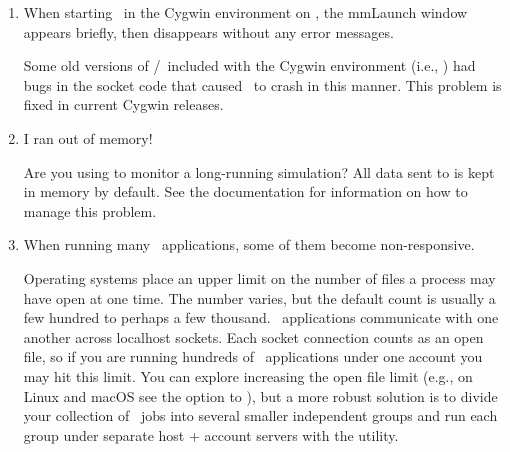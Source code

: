 \begin{enumerate}

\item When starting \OOMMF\ in the Cygwin environment on \Windows, the
mmLaunch window appears briefly, then disappears without any error
messages.

Some old versions of \Tcl/\Tk\ included with the Cygwin environment
(i.e., ) had bugs in the socket code
that caused \OOMMF\ to crash in this manner.  This problem is fixed in
current Cygwin releases.

\item I ran out of memory!

Are you using  to monitor a
long-running simulation?  All data sent to  is kept in
memory by default.  See the  documentation for information
on how to manage this problem.

\item When running many \OOMMF\ applications, some of them become
  non-responsive.

Operating systems place an upper limit on the number of files a process
may have open at one time. The number varies, but the default count is
usually a few hundred to perhaps a few thousand. \OOMMF\ applications
communicate with one another across localhost sockets. Each socket
connection counts as an open file, so if you are running hundreds of
\OOMMF\ applications under one account you may hit this limit. You can
explore increasing the open file limit (e.g., on Linux and macOS see the
 option to ), but a more robust solution is to
divide your collection of \OOMMF\ jobs into several smaller independent
groups and run each group under separate host + account servers with
the  utility.

\end{enumerate}



